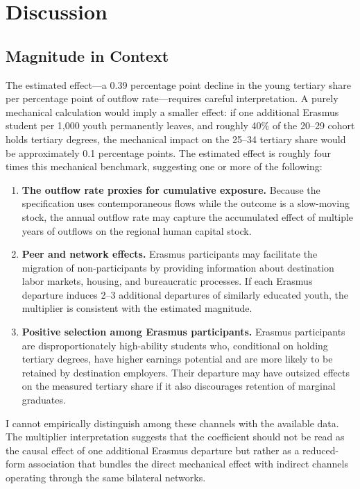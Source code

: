 \documentclass[12pt]{article}
\begin{document}
\section{Discussion}
\label{sec:discussion}

\subsection{Magnitude in Context}

The estimated effect---a 0.39 percentage point decline in the young tertiary share per percentage point of outflow rate---requires careful interpretation. A purely mechanical calculation would imply a smaller effect: if one additional Erasmus student per 1,000 youth permanently leaves, and roughly 40\% of the 20--29 cohort holds tertiary degrees, the mechanical impact on the 25--34 tertiary share would be approximately 0.1 percentage points. The estimated effect is roughly four times this mechanical benchmark, suggesting one or more of the following:

\begin{enumerate}
    \item \textbf{The outflow rate proxies for cumulative exposure.} Because the specification uses contemporaneous flows while the outcome is a slow-moving stock, the annual outflow rate may capture the accumulated effect of multiple years of outflows on the regional human capital stock.
    \item \textbf{Peer and network effects.} Erasmus participants may facilitate the migration of non-participants by providing information about destination labor markets, housing, and bureaucratic processes. If each Erasmus departure induces 2--3 additional departures of similarly educated youth, the multiplier is consistent with the estimated magnitude.
    \item \textbf{Positive selection among Erasmus participants.} Erasmus participants are disproportionately high-ability students who, conditional on holding tertiary degrees, have higher earnings potential and are more likely to be retained by destination employers. Their departure may have outsized effects on the measured tertiary share if it also discourages retention of marginal graduates.
\end{enumerate}

I cannot empirically distinguish among these channels with the available data. The multiplier interpretation suggests that the coefficient should not be read as the causal effect of one additional Erasmus departure but rather as a reduced-form association that bundles the direct mechanical effect with indirect channels operating through the same bilateral networks.
\end{document}

